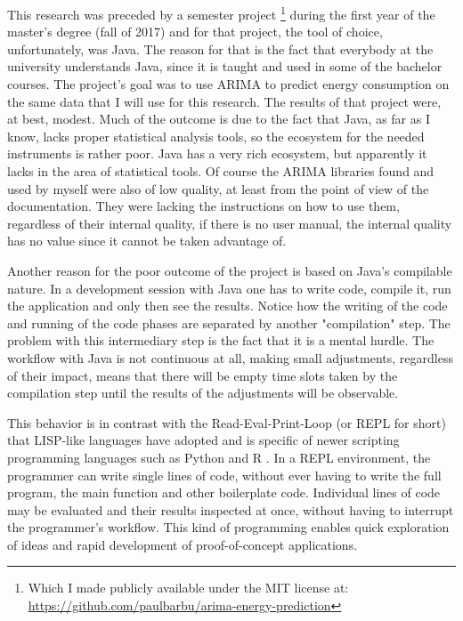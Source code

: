 \documentclass[12pt,a4paper,titlepage]{report}
\begin{document}
This research was preceded by a semester project \footnote{Which I made publicly available under the MIT license at: \url{https://github.com/paulbarbu/arima-energy-prediction}} during the first year of the master's degree (fall of 2017) and for that project, the tool of choice, unfortunately, was Java. The reason for that is the fact that everybody at the university understands Java, since it is taught and used in some of the bachelor courses. The project's goal was to use ARIMA to predict energy consumption on the same data that I will use for this research. The results of that project were, at best, modest. Much of the outcome is due to the fact that Java, as far as I know, lacks proper statistical analysis tools, so the ecosystem for the needed instruments is rather poor. Java has a very rich ecosystem, but apparently it lacks in the area of statistical tools. Of course the ARIMA libraries found and used by myself were also of low quality, at least from the point of view of the documentation. They were lacking the instructions on how to use them, regardless of their internal quality, if there is no user manual, the internal quality has no value since it cannot be taken advantage of.

Another reason for the poor outcome of the project is based on Java's compilable nature. In a development session with Java one has to write code, compile it, run the application and only then see the results. Notice how the writing of the code and running of the code phases are separated by another "compilation" step. The problem with this intermediary step is the fact that it is a mental hurdle. The workflow with Java is not continuous at all, making small adjustments, regardless of their impact, means that there will be empty time slots taken by the compilation step until the results of the adjustments will be observable.

This behavior is in contrast with the Read-Eval-Print-Loop (or REPL for short) that LISP-like languages have adopted and is specific of newer scripting programming languages such as Python and R \cite{hey2014computing}. In a REPL environment, the programmer can write single lines of code, without ever having to write the full program, the main function and other boilerplate code. Individual lines of code may be evaluated and their results inspected at once, without having to interrupt the programmer's workflow. This kind of programming enables quick exploration of ideas and rapid development of proof-of-concept applications.
\end{document}
